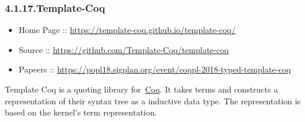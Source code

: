 \documentclass[12pt,twoside]{article}
\begin{document}
\subsubsection{4.1.17.\hspace*{0.5em}Template-Coq}\label{sec-template-coq}%

\begin{itemize}[noitemsep,topsep=\mdcompacttopsep]%

\item{}Home Page :: \href{https://template-coq.github.io/template-coq/}{{\ttfamily https://\hspace{0pt}template-\hspace{0pt}coq.\hspace{0pt}github.\hspace{0pt}io/\hspace{0pt}template-\hspace{0pt}coq/\hspace{0pt}}}%

\item{}Source :: \href{https://github.com/Template-Coq/template-coq}{{\ttfamily https://\hspace{0pt}github.\hspace{0pt}com/\hspace{0pt}Template-\hspace{0pt}Coq/\hspace{0pt}template-\hspace{0pt}coq}}%

\item{}Papeers :: \href{https://popl18.sigplan.org/event/coqpl-2018-typed-template-coq}{{\ttfamily https://\hspace{0pt}popl18.\hspace{0pt}sigplan.\hspace{0pt}org/\hspace{0pt}event/\hspace{0pt}coqpl-\hspace{0pt}2018-\hspace{0pt}typed-\hspace{0pt}template-\hspace{0pt}coq}}%
\end{itemize}%

\noindent{}Template Coq is a quoting library for~\href{http://coq.inria.fr}{Coq}. It
takes  terms and constructs a representation of their syntax tree as
a  inductive data type. The representation is based on the kernel's
term representation.%
\end{document}
